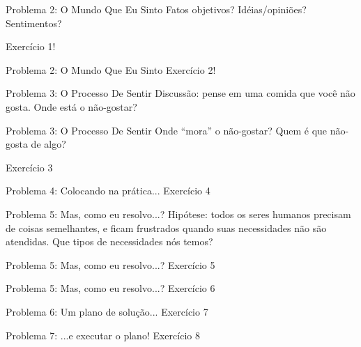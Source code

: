 \documentclass{beamer}
\begin{document}
\begin{frame}{Problema 2: O Mundo Que Eu Sinto}
  \Large
  Fatos objetivos? Idéias/opiniões? Sentimentos?


  Exercício 1!
\end{frame}

\begin{frame}{Problema 2: O Mundo Que Eu Sinto}
  \Large
  Exercício 2!
\end{frame}

\begin{frame}{Problema 3: O Processo De Sentir}
  \Large
  Discussão: pense em uma comida que você não gosta. Onde está o não-gostar?
\end{frame}

\begin{frame}{Problema 3: O Processo De Sentir}
  \Large
  Onde ``mora'' o não-gostar? Quem é que não-gosta de algo?

  Exercício 3
\end{frame}

\begin{frame}{Problema 4: Colocando na prática...}
  \Large
  Exercício 4
\end{frame}

\begin{frame}{Problema 5: Mas, como eu resolvo...?}
  \LARGE
  Hipótese: todos os seres humanos precisam de coisas semelhantes, e ficam
  frustrados quando suas necessidades não são atendidas. Que tipos de
  necessidades nós temos?
\end{frame}

\begin{frame}{Problema 5: Mas, como eu resolvo...?}
  \Large
  Exercício 5
\end{frame}

\begin{frame}{Problema 5: Mas, como eu resolvo...?}
  \Large
  Exercício 6
\end{frame}

\begin{frame}{Problema 6: Um plano de solução...}
  \Large
  Exercício 7
\end{frame}

\begin{frame}{Problema 7: ...e executar o plano!}
  \Large
  Exercício 8
\end{frame}
\end{document}
